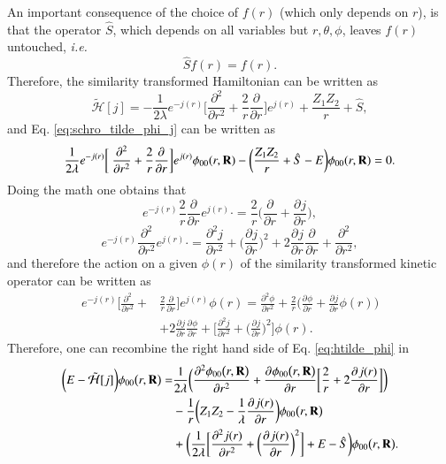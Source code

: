 \documentclass[aip,jcp,reprint,noshowkeys,superscriptaddress]{revtex4-1}
\newcommand{\deriv}[3]{\frac{\partial^{#3} #1}{\partial {#2}^{#3}}}
\newcommand{\bd}[1]{{\bf {#1}}}
\begin{document}
An important consequence of the choice of $f(r)$ (which only depends on $r$), is that the operator $\hat{S}$, which depends on all variables but $r,\theta,\phi$, leaves $f(r)$ untouched, \textit{i.e.}
\begin{equation}
 \hat{S} f(r) = f(r).
\end{equation}
Therefore, the similarity transformed Hamiltonian can be written as
\begin{equation}
  \tilde{\mathcal{H}}[j]  =  -\frac{1}{2\lambda} e^{-j(r)} \bigg[ \deriv{}{r}{2} + \frac{2}{r} \deriv{}{r}{}\bigg]  e^{j(r)}
+ \frac{Z_1 Z_2}{r}  + \hat{S},
\end{equation}
and Eq. \eqref{eq:schro_tilde_phi_j} can be written as
\begin{equation}
 \frac{1}{2\lambda} e^{-j(r)} \bigg[ \deriv{}{r}{2} + \frac{2}{r} \deriv{}{r}{}\bigg]  e^{j(r)}\phi_{00}(r,\bd{R}) 
- \bigg( \frac{Z_1 Z_2}{r}  + \hat{S} -E \bigg) \phi_{00}(r,\bd{R}) = 0.
\end{equation}
Doing the math one obtains that 
\begin{equation}
 e^{-j(r)} \frac{2}{r} \deriv{}{r}{} e^{j(r)} \cdot = \frac{2}{r}\bigg( \deriv{}{r}{} + \deriv{j}{r}{} \bigg),
\end{equation}
\begin{equation}
 e^{-j(r)} \deriv{}{r}{2} e^{j(r)} \cdot = \deriv{j}{r}{2} + \bigg( \deriv{j}{r}{} \bigg)^2 + 2 \deriv{j}{r}{} \deriv{}{r}{} + \deriv{}{r}{2},
\end{equation}
and therefore the action on a given $\phi(r)$ of the similarity transformed kinetic operator can be written as 
\begin{equation}
 \begin{aligned}
  e^{-j(r)} \bigg[ \deriv{}{r}{2} + &\frac{2}{r} \deriv{}{r}{}\bigg]  e^{j(r)} \phi(r) =  \deriv{\phi}{r}{2} + \frac{2}{r} \bigg( \deriv{\phi}{r}{}+ \deriv{j}{r}{}\phi(r) \bigg) \\ 
& + 2 \deriv{j}{r}{} \deriv{\phi}{r}{} + \bigg[\deriv{j}{r}{2} + \bigg( \deriv{j}{r}{} \bigg)^2\bigg] \phi(r). 
 \end{aligned}
\end{equation}
Therefore, one can recombine the right hand side of Eq. \eqref{eq:htilde_phi} in 
\begin{equation}
 \label{eq:tilde_2}
 \begin{aligned}
  \bigg(E -\tilde{\mathcal{H}}[j]\bigg) \phi_{00}\big(r,\bd{R}\big) = & \frac{1}{2\lambda} \bigg( \deriv{\phi_{00}\big(r,\bd{R}\big)}{r}{2} +   \deriv{\phi_{00}\big(r,\bd{R}\big)}{r}{} \bigg[ \frac{2}{r}+ 2 \deriv{j(r)}{r}{}\bigg] \bigg)  \\
& - \frac{1}{r} \bigg( Z_1 Z_2 - \frac{1}{\lambda}  \deriv{j(r)}{r}{} \bigg) \phi_{00}\big(r,\bd{R}\big) \\
& + \bigg( \frac{1}{2\lambda}\bigg[ \deriv{j(r)}{r}{2} + \bigg(\deriv{j(r)}{r}{}\bigg)^2\bigg] + E  - \hat{S} \bigg)\phi_{00}\big(r,\bd{R}\big).
 \end{aligned}
\end{equation}
\end{document}
